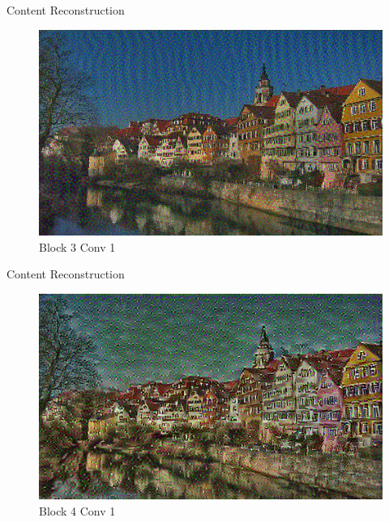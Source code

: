 \documentclass{beamer}
\begin{document}
\begin{frame}{Content Reconstruction}
\begin{figure}[ht]
\centering
\caption{Block 3 Conv 1}
\includegraphics[width=\textwidth]{img/content/block3_conv1.png}
\end{figure}
\end{frame}

\begin{frame}{Content Reconstruction}
\begin{figure}[ht]
\centering
\caption{Block 4 Conv 1}
\includegraphics[width=\textwidth]{img/content/block4_conv1.png}
\end{figure}
\end{frame}
\end{document}
